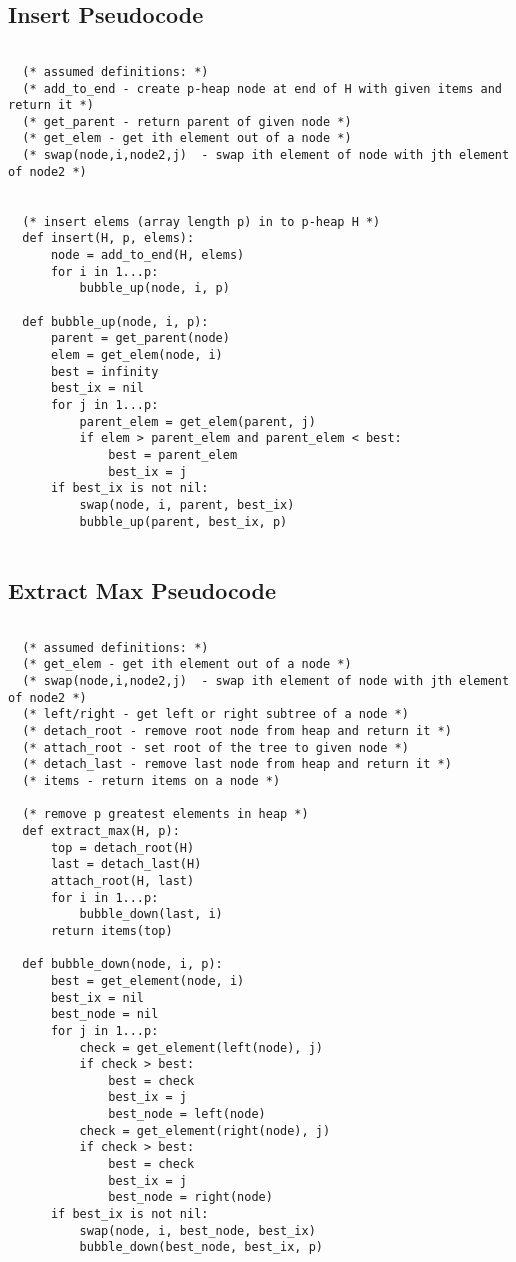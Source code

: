 \documentclass[a4paper,12pt]{article}
\begin{document}
\subsection*{Insert Pseudocode}


\begin{verbatim}

  (* assumed definitions: *)
  (* add_to_end - create p-heap node at end of H with given items and return it *)
  (* get_parent - return parent of given node *)
  (* get_elem - get ith element out of a node *)
  (* swap(node,i,node2,j)  - swap ith element of node with jth element of node2 *)


  (* insert elems (array length p) in to p-heap H *)
  def insert(H, p, elems):
      node = add_to_end(H, elems)
      for i in 1...p:
          bubble_up(node, i, p)

  def bubble_up(node, i, p):
      parent = get_parent(node)
      elem = get_elem(node, i)
      best = infinity
      best_ix = nil
      for j in 1...p:
          parent_elem = get_elem(parent, j)
          if elem > parent_elem and parent_elem < best:
              best = parent_elem
              best_ix = j
      if best_ix is not nil:
          swap(node, i, parent, best_ix)
          bubble_up(parent, best_ix, p)
          
\end{verbatim}

\pagebreak

\subsection*{Extract Max Pseudocode}

\begin{verbatim}

  (* assumed definitions: *)
  (* get_elem - get ith element out of a node *)
  (* swap(node,i,node2,j)  - swap ith element of node with jth element of node2 *)
  (* left/right - get left or right subtree of a node *)
  (* detach_root - remove root node from heap and return it *)
  (* attach_root - set root of the tree to given node *)
  (* detach_last - remove last node from heap and return it *)
  (* items - return items on a node *)

  (* remove p greatest elements in heap *)
  def extract_max(H, p):
      top = detach_root(H)
      last = detach_last(H)
      attach_root(H, last)
      for i in 1...p:
          bubble_down(last, i)
      return items(top)

  def bubble_down(node, i, p):
      best = get_element(node, i)
      best_ix = nil
      best_node = nil
      for j in 1...p:
          check = get_element(left(node), j)
          if check > best:
              best = check
              best_ix = j
              best_node = left(node)
          check = get_element(right(node), j)
          if check > best:
              best = check
              best_ix = j
              best_node = right(node)
      if best_ix is not nil:
          swap(node, i, best_node, best_ix)
          bubble_down(best_node, best_ix, p)

      

\end{verbatim}
\end{document}
